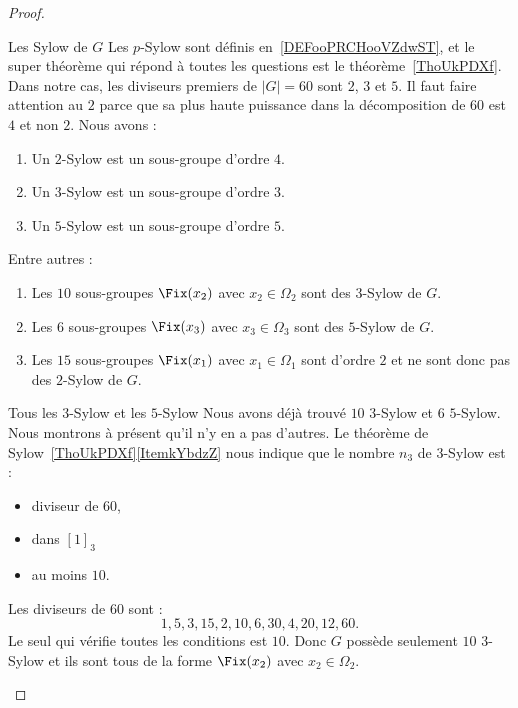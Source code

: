 \begin{proof}
\begin{subproof}
		\item[Les Sylow de \( G\)]
		Les \( p\)-Sylow sont définis en~\ref{DEFooPRCHooVZdwST}, et le super théorème qui répond à toutes les questions est le théorème~\ref{ThoUkPDXf}. Dans notre cas, les diviseurs premiers de \( | G |=60\) sont \( 2\), \( 3\) et \( 5\). Il faut faire attention au $2$ parce que sa plus haute puissance dans la décomposition de \( 60\) est \( 4\) et non \( 2\). Nous avons :
		\begin{enumerate}
			\item
			      Un \( 2\)-Sylow est un sous-groupe d'ordre \( 4\).
			\item
			      Un \( 3\)-Sylow est un sous-groupe d'ordre \( 3\).
			\item
			      Un \( 5\)-Sylow est un sous-groupe d'ordre \( 5\).
		\end{enumerate}
		Entre autres :
		\begin{enumerate}
			\item
			      Les \( 10\) sous-groupes \( \Fix(x_2)\) avec \( x_2\in \Omega_2\) sont des \( 3\)-Sylow de \( G\).
			\item
			      Les \( 6\) sous-groupes \( \Fix(x_3)\) avec \( x_3\in \Omega_3\) sont des \( 5\)-Sylow de \( G\).
			\item
			      Les \( 15\) sous-groupes \( \Fix(x_1)\) avec \( x_1\in \Omega_1\) sont d'ordre $2$ et ne sont donc pas des \( 2\)-Sylow de \( G\).
		\end{enumerate}

		\item[Tous les \( 3\)-Sylow et les \( 5\)-Sylow]
		Nous avons déjà trouvé \( 10\) \( 3\)-Sylow et \( 6\) \( 5\)-Sylow. Nous montrons à présent qu'il n'y en a pas d'autres. Le théorème de Sylow~\ref{ThoUkPDXf}\ref{ItemkYbdzZ} nous indique que le nombre \( n_3\) de \( 3\)-Sylow est :
		\begin{itemize}
			\item diviseur de \( 60\),
			\item dans \( [1]_3\)
			\item au moins \( 10\).
		\end{itemize}
		Les diviseurs de \( 60\) sont :
		\begin{equation}
			1,5,3,15,2,10,6,30,4,20,12,60.
		\end{equation}
		Le seul qui vérifie toutes les conditions est \( 10\). Donc \( G\) possède seulement \( 10\) \( 3\)-Sylow et ils sont tous de la forme \( \Fix(x_2)\) avec \( x_2\in \Omega_2\).


\end{subproof}
\end{proof}

